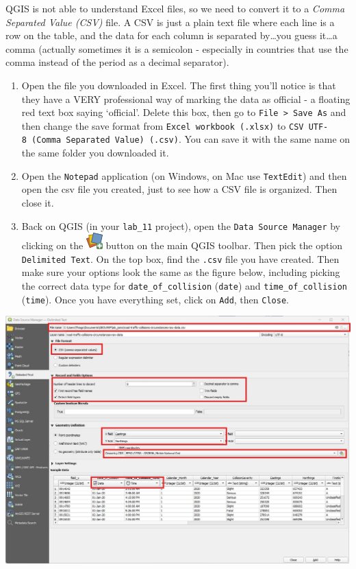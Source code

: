 \documentclass[
  letterpaper,
  DIV=11,
  numbers=noendperiod]{scrreprt}
\begin{document}
QGIS is not able to understand Excel files, so we need to convert it to
a \emph{Comma Separated Value (CSV)} file. A CSV is just a plain text
file where each line is a row on the table, and the data for each column
is separated by\ldots you guess it\ldots a comma (actually sometimes it
is a semicolon - especially in countries that use the comma instead of
the period as a decimal separator).

\begin{enumerate}
\def\labelenumi{(\arabic{enumi})}
\setcounter{enumi}{307}
\item
  Open the file you downloaded in Excel. The first thing you'll notice
  is that they have a VERY professional way of marking the data as
  official - a floating red text box saying `official'. Delete this box,
  then go to \texttt{File\ \textgreater{}\ Save\ As} and then change the
  save format from \texttt{Excel\ workbook\ (.xlsx)} to
  \texttt{CSV\ UTF-8\ (Comma\ Separated\ Value)\ (.csv)}. You can save
  it with the same name on the same folder you downloaded it.
\item
  Open the \texttt{Notepad} application (on Windows, on Mac use
  \texttt{TextEdit}) and then open the csv file you created, just to see
  how a CSV file is organized. Then close it.
\item
  Back on QGIS (in your \texttt{lab\_11} project), open the
  \texttt{Data\ Source\ Manager} by clicking on the
  \includegraphics{index_files/mediabag/mActionDataSourceMan.png} button
  on the main QGIS toolbar. Then pick the option
  \texttt{Delimited\ Text}. On the top box, find the \texttt{.csv} file
  you have created. Then make sure your options look the same as the
  figure below, including picking the correct data type for
  \texttt{date\_of\_collision} (\texttt{date}) and
  \texttt{time\_of\_collision} (\texttt{time}). Once you have everything
  set, click on \texttt{Add}, then \texttt{Close}.
\end{enumerate}

\includegraphics{images/lab_11/lab_11_fig_3_data_source_manager.jpg}
\end{document}
